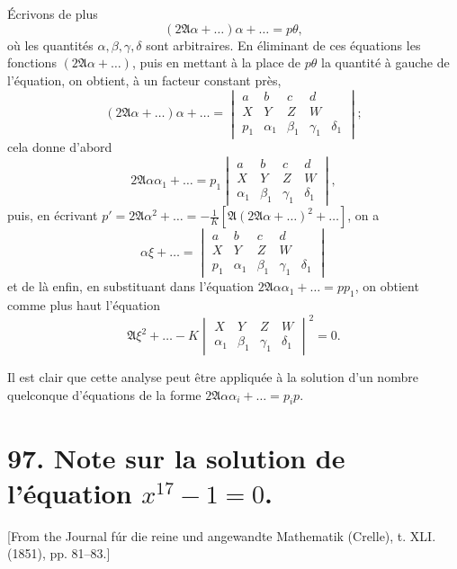 \documentclass[11pt,a4paper]{book}
\begin{document}
\'{E}crivons de plus
\[
(2\mathfrak{A}\alpha + \ldots)\alpha + \ldots = p\theta,
\]
o\`{u} les quantit\'{e}s $\alpha, \beta, \gamma, \delta$ sont arbitraires. En \'{e}liminant de ces \'{e}quations les fonctions $(2\mathfrak{A}\alpha + \ldots)$, puis en mettant \`{a} la place de $p\theta$ la quantit\'{e} \`{a} gauche de l'\'{e}quation, on obtient, \`{a} un facteur constant pr\`{e}s,
\[
(2\mathfrak{A}\alpha + \ldots)\alpha + \ldots =
\begin{vmatrix}
a & b & c & d \\
X & Y & Z & W \\
p_1 & \alpha_1 & \beta_1 & \gamma_1 & \delta_1
\end{vmatrix};
\]
cela donne d'abord
\[
2\mathfrak{A}\alpha\alpha_1 + \ldots = p_1
\begin{vmatrix}
a & b & c & d \\
X & Y & Z & W \\
\alpha_1 & \beta_1 & \gamma_1 & \delta_1
\end{vmatrix},
\]
puis, en \'{e}crivant $p' = 2\mathfrak{A}\alpha^2 + \ldots = -\frac{1}{K}[\mathfrak{A}(2\mathfrak{A}\alpha + \ldots)^2 + \ldots]$, on a
\[
\alpha\xi + \ldots =
\begin{vmatrix}
a & b & c & d \\
X & Y & Z & W \\
p_1 & \alpha_1 & \beta_1 & \gamma_1 & \delta_1
\end{vmatrix}
\]
et de l\`{a} enfin, en substituant dans l'\'{e}quation $2\mathfrak{A}\alpha\alpha_1 + \ldots = pp_1$, on obtient comme plus haut l'\'{e}quation
\[
\mathfrak{A}\xi^2 + \ldots - K
\begin{vmatrix}
X & Y & Z & W \\
\alpha_1 & \beta_1 & \gamma_1 & \delta_1
\end{vmatrix}^2 = 0.
\]

Il est clair que cette analyse peut \^{e}tre appliqu\'{e}e \`{a} la solution d'un nombre quelconque d'\'{e}quations de la forme $2\mathfrak{A}\alpha\alpha_i + \ldots = p_i p$.

\newpage

\section*{97. Note sur la solution de l'\'{e}quation $x^{17} - 1 = 0$.}

[From the Journal f\'{u}r die reine und angewandte Mathematik (Crelle), t. XLI. (1851), pp. 81--83.]
\end{document}
